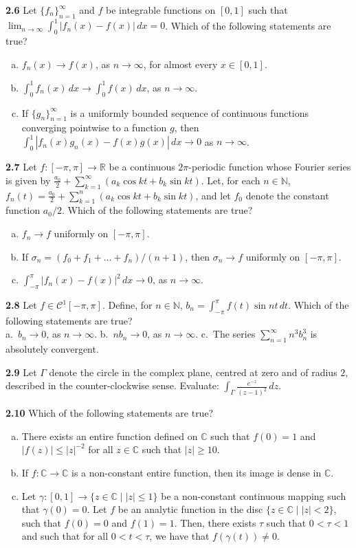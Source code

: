 \documentclass[11pt,a4paper]{article}
\newcommand{\N}{\mathbb{N}}
\newcommand{\R}{\mathbb{R}}
\newcommand{\C}{\mathbb{C}}
\newcommand{\qitem}[1]{\par\medskip\noindent\textbf{#1}\hspace{0.5em}}
\begin{document}
\qitem{2.6} Let $\{f_n\}_{n=1}^{\infty}$ and $f$ be integrable functions on $[0, 1]$ such that $\lim_{n \to \infty} \int_0^1 |f_n(x) - f(x)|\,dx = 0$. Which of the following statements are true?
\begin{enumerate}[a.]
  \item $f_n(x) \to f(x)$, as $n \to \infty$, for almost every $x \in [0, 1]$.
  \item $\int_0^1 f_n(x)\,dx \to \int_0^1 f(x)\,dx$, as $n \to \infty$.
  \item If $\{g_n\}_{n=1}^{\infty}$ is a uniformly bounded sequence of continuous functions converging pointwise to a function $g$, then $\int_0^1 |f_n(x)g_n(x) - f(x)g(x)|\,dx \to 0$ as $n \to \infty$.
\end{enumerate}

\qitem{2.7} Let $f : [-\pi, \pi] \to \R$ be a continuous $2\pi$-periodic function whose Fourier series is given by $\frac{a_0}{2} + \sum_{k=1}^{\infty} (a_k\cos kt + b_k\sin kt)$. Let, for each $n \in \N$, $f_n(t) = \frac{a_0}{2} + \sum_{k=1}^{n} (a_k\cos kt + b_k\sin kt)$, and let $f_0$ denote the constant function $a_0/2$. Which of the following statements are true?
\begin{enumerate}[a.]
  \item $f_n \to f$ uniformly on $[-\pi, \pi]$.
  \item If $\sigma_n = (f_0 + f_1 + \dots + f_n)/(n + 1)$, then $\sigma_n \to f$ uniformly on $[-\pi, \pi]$.
  \item $\int_{-\pi}^{\pi} |f_n(x) - f(x)|^2\,dx \to 0$, as $n \to \infty$.
\end{enumerate}

\qitem{2.8} Let $f \in \mathcal{C}^1[-\pi, \pi]$. Define, for $n \in \N$, $b_n = \int_{-\pi}^{\pi} f(t)\sin nt\,dt$. Which of the following statements are true?\\
a.\ $b_n \to 0$, as $n \to \infty$. \qquad b.\ $nb_n \to 0$, as $n \to \infty$. \qquad c.\ The series $\sum_{n=1}^{\infty} n^3 b_n^3$ is absolutely convergent.

\qitem{2.9} Let $\Gamma$ denote the circle in the complex plane, centred at zero and of radius $2$, described in the counter-clockwise sense. Evaluate: $\displaystyle\int_\Gamma \frac{e^{-z}}{(z - 1)^2}\,dz$.

\qitem{2.10} Which of the following statements are true?
\begin{enumerate}[a.]
  \item There exists an entire function defined on $\C$ such that $f(0) = 1$ and $|f(z)| \le |z|^{-2}$ for all $z \in \C$ such that $|z| \ge 10$.
  \item If $f : \C \to \C$ is a non-constant entire function, then its image is dense in $\C$.
  \item Let $\gamma : [0, 1] \to \{z \in \C \mid |z| \le 1\}$ be a non-constant continuous mapping such that $\gamma(0) = 0$. Let $f$ be an analytic function in the disc $\{z \in \C \mid |z| < 2\}$, such that $f(0) = 0$ and $f(1) = 1$. Then, there exists $\tau$ such that $0 < \tau < 1$ and such that for all $0 < t < \tau$, we have that $f(\gamma(t)) \neq 0$.
\end{enumerate}
\end{document}

